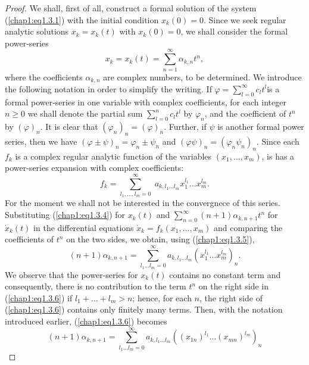 \begin{proof}
We shall, first of all, construct a formal solution of the system (\ref{chap1:eq1.3.1}) with the initial condition $x_k (0) = 0$. Since we seek regular analytic solutions $x_k = x_k (t)$ with $x_k(0) =  0$, we shall consider the formal power-series
\begin{equation*}
x_k = x_k(t) = \sum\limits^\infty_{n=1} \alpha_{k,n} t^n, \tag{1.3.4}\label{chap1:eq1.3.4}
\end{equation*}
where the coefficients $\alpha_{k,n}$ are complex numbers, to be determined. We introduce the following notation in order to simplify the writing. If $\varphi = \sum\limits^\infty_{l=0} c_l t^l$\pageoriginale is a formal power-series in one variable with complex coefficients, for each integer $n \geq 0$ we shall denote the partial sum $\sum\limits^n_{l=0} c_l t^l$ by $\varphi_n$, and the coefficient of $t^n$ by $(\varphi)_n$. It is clear that $(\varphi_n)_n = (\varphi)_n$. Further, if $\psi $ is another formal power series, then we have $(\varphi \pm \psi)_n = \varphi_n\pm \psi_n$ and $(\varphi \psi)_n = (\varphi_n \psi_n)_n$. Since each $f_k$ is a complex regular analytic function of the variables $(x_1, \ldots, x_m)$, is has a power-series expansion with complex coefficients:
\begin{equation*}
f_k = \sum\limits^\infty_{l_1, \ldots, l_m = 0} \; a_{k,l_1 \ldots l_m}  x^{l_1}_1 \ldots x^{l_m}_m .\tag{1.3.5}\label{chap1:eq1.3.5}
\end{equation*}
For the moment we shall not be interested in the convergnece of this series. Substituting (\ref{chap1:eq1.3.4}) for $x_k(t)$ and $\sum\limits^\infty_{n=0} (n+1) \alpha_{k,n+1} t^n$ for $\dot{x}_k(t)$ in the differential equations $\dot{x}_k = f_k(x_1, \ldots, x_m)$ and comparing the coefficients of $t^n$ on the two sides, we obtain, using (\ref{chap1:eq1.3.5}),
\begin{equation*}
(n+1) \alpha_{k,n+1} = \sum\limits^\infty_{l_1 \ldots l_m =  0} a_{k,l_1\ldots l_m} (x^{l_1}_1 \ldots x^{l_m}_m)_n. \tag{1.3.6}\label{chap1:eq1.3.6}
\end{equation*}
We observe that the power-series for $x_k(t)$ contains  no constant term and consequently, there is no contribution to the term $t^n$ on the right side in (\ref{chap1:eq1.3.6}) if $l_1 + \ldots + l_m > n$; hence, for each $n$, the right side of (\ref{chap1:eq1.3.6}) contains only finitely many terms. Then, with the notation introduced earlier, (\ref{chap1:eq1.3.6}) becomes
\begin{equation*}
(n+1) \alpha_{k,n+1} = \sum\limits^\infty_{l_1 \ldots l_m = 0} a_{k, l_1 \ldots l_m} ((x_{1n})^{l_1} \ldots (x_{mn})^{l_m})_n\tag{1.3.7}\label{chap1:eq1.3.7}
\end{equation*}


\end{proof}
